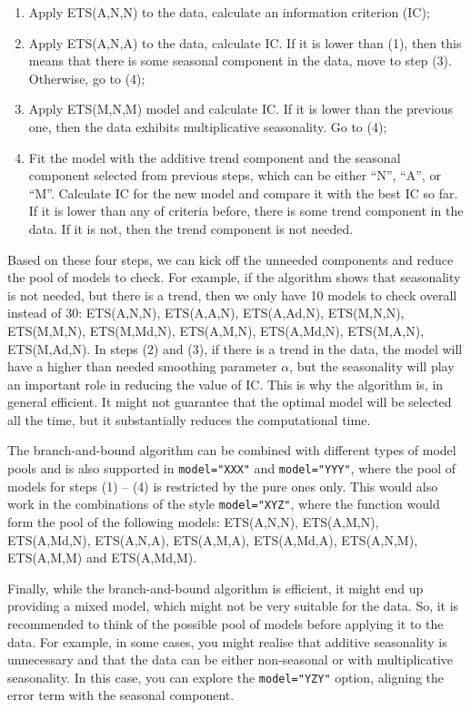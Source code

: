 \documentclass[
]{book}
\providecommand{\tightlist}{%
  \setlength{\itemsep}{0pt}\setlength{\parskip}{0pt}}
\theoremstyle{definition}
\theoremstyle{definition}
\theoremstyle{definition}
\theoremstyle{definition}
\theoremstyle{remark}
\begin{document}
\begin{enumerate}
\def\labelenumi{\arabic{enumi}.}
\tightlist
\item
  Apply ETS(A,N,N) to the data, calculate an information criterion (IC);
\item
  Apply ETS(A,N,A) to the data, calculate IC. If it is lower than (1), then this means that there is some seasonal component in the data, move to step (3). Otherwise, go to (4);
\item
  Apply ETS(M,N,M) model and calculate IC. If it is lower than the previous one, then the data exhibits multiplicative seasonality. Go to (4);
\item
  Fit the model with the additive trend component and the seasonal component selected from previous steps, which can be either ``N'', ``A'', or ``M''. Calculate IC for the new model and compare it with the best IC so far. If it is lower than any of criteria before, there is some trend component in the data. If it is not, then the trend component is not needed.
\end{enumerate}

Based on these four steps, we can kick off the unneeded components and reduce the pool of models to check. For example, if the algorithm shows that seasonality is not needed, but there is a trend, then we only have 10 models to check overall instead of 30: ETS(A,N,N), ETS(A,A,N), ETS(A,Ad,N), ETS(M,N,N), ETS(M,M,N), ETS(M,Md,N), ETS(A,M,N), ETS(A,Md,N), ETS(M,A,N), ETS(M,Ad,N). In steps (2) and (3), if there is a trend in the data, the model will have a higher than needed smoothing parameter \(\alpha\), but the seasonality will play an important role in reducing the value of IC. This is why the algorithm is, in general efficient. It might not guarantee that the optimal model will be selected all the time, but it substantially reduces the computational time.

The branch-and-bound algorithm can be combined with different types of model pools and is also supported in \texttt{model="XXX"} and \texttt{model="YYY"}, where the pool of models for steps (1) -- (4) is restricted by the pure ones only. This would also work in the combinations of the style \texttt{model="XYZ"}, where the function would form the pool of the following models: ETS(A,N,N), ETS(A,M,N), ETS(A,Md,N), ETS(A,N,A), ETS(A,M,A), ETS(A,Md,A), ETS(A,N,M), ETS(A,M,M) and ETS(A,Md,M).

Finally, while the branch-and-bound algorithm is efficient, it might end up providing a mixed model, which might not be very suitable for the data. So, it is recommended to think of the possible pool of models before applying it to the data. For example, in some cases, you might realise that additive seasonality is unnecessary and that the data can be either non-seasonal or with multiplicative seasonality. In this case, you can explore the \texttt{model="YZY"} option, aligning the error term with the seasonal component.
\end{document}
